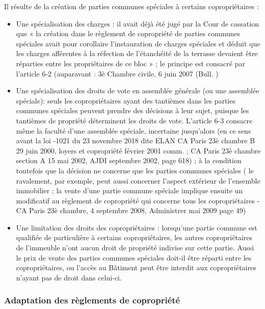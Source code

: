 		Il résulte de la création de parties communes spéciales à certains copropriétaires :
		\begin{itemize}
			\item Une spécialisation des charges : il avait déjà été jugé par la Cour de cassation que « la
			création dans le règlement de copropriété de parties communes spéciales avait pour
			corollaire l’instauration de charges spéciales et déduit que les charges afférentes à la
			réfection de l’étanchéité de la terrasse devaient être réparties entre les propriétaires de ce
			bloc » ; le principe est consacré par l’article 6-2 (auparavant : 3è Chambre civile, 6 juin 2007
			(Bull. )
			\item  Une spécialisation des droits de vote en assemblée générale (ou une assemblée spéciale):
			seuls les copropriétaires ayant des tantièmes dans les parties communes spéciales peuvent
			prendre des décisions à leur sujet, puisque les tantièmes de propriété déterminent les
			droits de vote. L’article 6-3 consacre même la faculté d’une assemblée spéciale, incertaine
			jusqu’alors (en ce sens avant la loi -1021 du 23 novembre 2018 dite ELAN CA Paris
			23è chambre B 29 juin 2000, loyers et copropriété février 2001 comm.  ; CA Paris 23è
			chambre section A 15 mai 2002, AJDI septembre 2002, page 618) ; à la condition toutefois
			que la décision ne concerne que les parties communes spéciales ( le ravalement, par
			exemple, peut aussi concerner l’aspect extérieur de l’ensemble immobilier ; la vente d’une
			partie commune spéciale implique ensuite un modificatif au règlement de copropriété qui
			concerne tous les copropriétaires - CA Paris 23è chambre, 4 septembre 2008, Administrer
			mai 2009 page 49)
			\item  Une limitation des droits des copropriétaires : lorsqu'une partie commune est qualifiée de
			particulière à certains copropriétaires, les autres copropriétaires de l'immeuble n'ont
			aucun droit de propriété indivise sur cette partie. Aussi le prix de vente des parties
			communes spéciales doit-il être réparti entre les copropriétaires, ou l’accès au Bâtiment
			peut être interdit aux copropriétaires n’ayant pas de droit dans celui-ci.
		\end{itemize}
		
		\subsubsection{Adaptation des règlements de copropriété}
		
